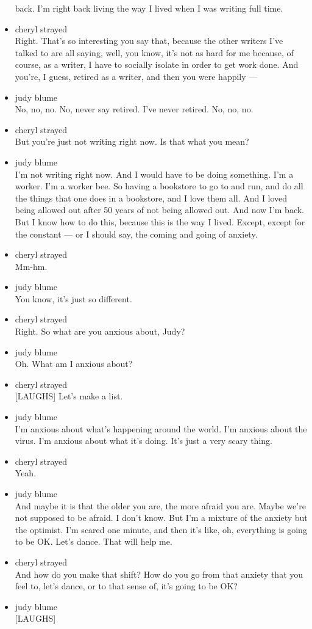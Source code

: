 \begin{itemize}
  back. I'm right back living the way I lived when I was writing full
  time.
\item
  cheryl strayed\\
  Right. That's so interesting you say that, because the other writers
  I've talked to are all saying, well, you know, it's not as hard for me
  because, of course, as a writer, I have to socially isolate in order
  to get work done. And you're, I guess, retired as a writer, and then
  you were happily ---
\item
  judy blume\\
  No, no, no. No, never say retired. I've never retired. No, no, no.
\item
  cheryl strayed\\
  But you're just not writing right now. Is that what you mean?
\item
  judy blume\\
  I'm not writing right now. And I would have to be doing something. I'm
  a worker. I'm a worker bee. So having a bookstore to go to and run,
  and do all the things that one does in a bookstore, and I love them
  all. And I loved being allowed out after 50 years of not being allowed
  out. And now I'm back. But I know how to do this, because this is the
  way I lived. Except, except for the constant --- or I should say, the
  coming and going of anxiety.
\item
  cheryl strayed\\
  Mm-hm.
\item
  judy blume\\
  You know, it's just so different.
\item
  cheryl strayed\\
  Right. So what are you anxious about, Judy?
\item
  judy blume\\
  Oh. What am I anxious about?
\item
  cheryl strayed\\
  {[}LAUGHS{]} Let's make a list.
\item
  judy blume\\
  I'm anxious about what's happening around the world. I'm anxious about
  the virus. I'm anxious about what it's doing. It's just a very scary
  thing.
\item
  cheryl strayed\\
  Yeah.
\item
  judy blume\\
  And maybe it is that the older you are, the more afraid you are. Maybe
  we're not supposed to be afraid. I don't know. But I'm a mixture of
  the anxiety but the optimist. I'm scared one minute, and then it's
  like, oh, everything is going to be OK. Let's dance. That will help
  me.
\item
  cheryl strayed\\
  And how do you make that shift? How do you go from that anxiety that
  you feel to, let's dance, or to that sense of, it's going to be OK?
\item
  judy blume\\
  {[}LAUGHS{]}


\end{itemize}
